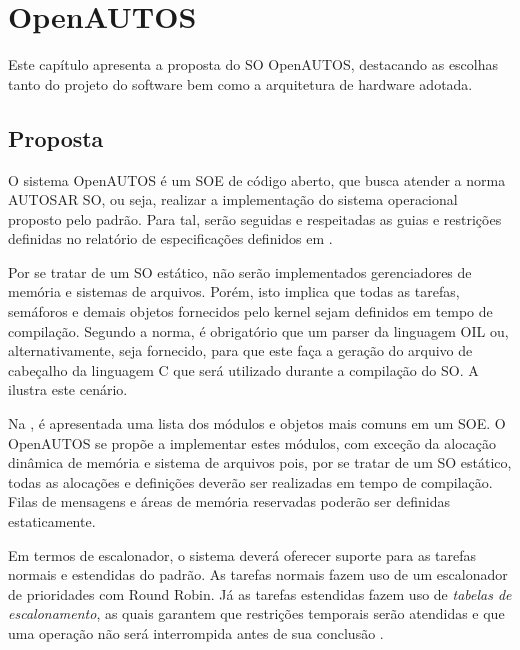 \chapter{OpenAUTOS}

Este capítulo apresenta a proposta do SO OpenAUTOS, destacando as escolhas tanto do projeto do software bem como a arquitetura de hardware adotada.

\section{Proposta}

O sistema OpenAUTOS é um SOE de código aberto, que busca atender a norma AUTOSAR SO, ou seja, realizar a implementação do sistema operacional proposto pelo padrão. Para tal, serão seguidas e respeitadas as guias e restrições definidas no relatório de especificações definidos em .

Por se tratar de um SO estático, não serão implementados gerenciadores de memória e sistemas de arquivos. Porém, isto implica que todas as tarefas, semáforos e demais objetos fornecidos pelo kernel sejam definidos em tempo de compilação. Segundo a norma, é obrigatório que um parser da linguagem OIL ou, alternativamente,  seja fornecido, para que este faça a geração do arquivo de cabeçalho da linguagem C que será utilizado durante a compilação do SO. A  ilustra este cenário.


Na , é apresentada uma lista dos módulos e objetos mais comuns em um SOE. O OpenAUTOS se propõe a implementar estes módulos, com exceção da alocação dinâmica de memória e sistema de arquivos pois, por se tratar de um SO estático, todas as alocações e definições deverão ser realizadas em tempo de compilação. Filas de mensagens e áreas de memória reservadas poderão ser definidas estaticamente.


Em termos de escalonador, o sistema deverá oferecer suporte para as tarefas normais e estendidas do padrão. As tarefas normais fazem uso de um escalonador de prioridades com Round Robin. Já as tarefas estendidas fazem uso de \emph{tabelas de escalonamento}, as quais garantem que restrições temporais serão atendidas e que uma operação não será interrompida antes de sua conclusão \cite{AUTOSAR:SOS}.

